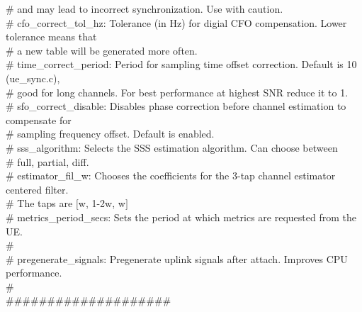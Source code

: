 \#                       and may lead to incorrect synchronization. Use with caution.   \\
\# cfo\_correct\_tol\_hz:   Tolerance (in Hz) for digial CFO compensation. Lower tolerance means that   \\
\#                       a new table will be generated more often.   \\
\# time\_correct\_period:  Period for sampling time offset correction. Default is 10 (ue\_sync.c),   \\
\#                       good for long channels. For best performance at highest SNR reduce it to 1.  \\  
\# sfo\_correct\_disable:  Disables phase correction before channel estimation to compensate for   \\
\#                       sampling frequency offset. Default is enabled.   \\
\# sss\_algorithm:        Selects the SSS estimation algorithm. Can choose between   \\
\#                       {full, partial, diff}.   \\
\# estimator\_fil\_w:      Chooses the coefficients for the 3-tap channel estimator centered filter.  \\ 
\#                       The taps are $[$w, 1-2w, w$]$  \\
\# metrics\_period\_secs:  Sets the period at which metrics are requested from the UE.   \\
\#  \\
\# pregenerate\_signals:  Pregenerate uplink signals after attach. Improves CPU performance.  \\
\#  \\
\#\#\#\#\#\#\#\#\#\#\#\#\#\#\#\#\#\#\#\#  \\

